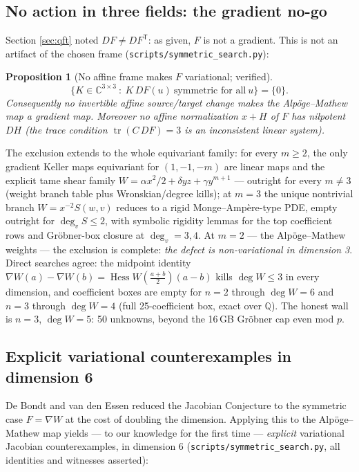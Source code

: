 \documentclass[11pt]{article}
\newtheorem{proposition}[theorem]{Proposition}
\theoremstyle{definition}
\theoremstyle{remark}
\newcommand{\C}{\mathbb{C}}
\newcommand{\Q}{\mathbb{Q}}
\begin{document}
\subsection{No action in three fields: the gradient no-go}
\label{sec:nogo3}

Section \ref{sec:qft} noted $DF\ne DF^{\mathsf T}$: as given, $F$ is
not a gradient. This is not an artifact of the chosen frame
(\texttt{scripts/symmetric\_search.py}):

\begin{proposition}[No affine frame makes $F$ variational; verified]
\label{prop:nogradient}
\[
\bigl\{K\in\C^{3\times3}\ :\ K\,DF(u)\ \text{symmetric for all}\
u\bigr\}=\{0\}.
\]
Consequently no invertible affine source/target change makes the
Alp\"oge--Mathew map a gradient map. Moreover no affine normalization
$x+H$ of $F$ has nilpotent $DH$ (the trace condition
$\operatorname{tr}(C\,DF)=3$ is an inconsistent linear system).
\end{proposition}

The exclusion extends to the whole equivariant family: for every
$m\ge2$, the only gradient Keller maps equivariant for $(1,-1,-m)$ are
linear maps and the explicit tame shear family
$W=\alpha x^2/2+\delta yz+\gamma y^{m+1}$ --- outright for every
$m\ne3$ (weight branch table plus Wronskian/degree kills); at $m=3$
the unique nontrivial branch $W=x^{-2}S(w,v)$ reduces to a rigid
Monge--Amp\`ere-type PDE, empty outright for $\deg_v S\le2$, with
symbolic rigidity lemmas for the top coefficient rows and Gr\"obner-box
closure at $\deg_v=3,4$. At $m=2$ --- the Alp\"oge--Mathew weights ---
the exclusion is complete: \emph{the defect is non-variational in
dimension 3}. Direct searches agree: the midpoint identity
$\nabla W(a)-\nabla W(b)=\operatorname{Hess}W(\tfrac{a+b}{2})(a-b)$
kills $\deg W\le3$ in every dimension, and coefficient boxes are empty
for $n=2$ through $\deg W=6$ and $n=3$ through $\deg W=4$ (full
25-coefficient box, exact over $\Q$). The honest wall is $n=3$,
$\deg W=5$: 50 unknowns, beyond the 16\,GB Gr\"obner cap even mod $p$.

\subsection{Explicit variational counterexamples in dimension 6}
\label{sec:dim6}

De Bondt and van den Essen \cite{dBvdE05} reduced the Jacobian
Conjecture to the symmetric case $F=\nabla W$ at the cost of doubling
the dimension. Applying this to the Alp\"oge--Mathew map yields ---
to our knowledge for the first time --- \emph{explicit} variational
Jacobian counterexamples, in dimension 6
(\texttt{scripts/symmetric\_search.py}, all identities and witnesses
asserted):
\end{document}
